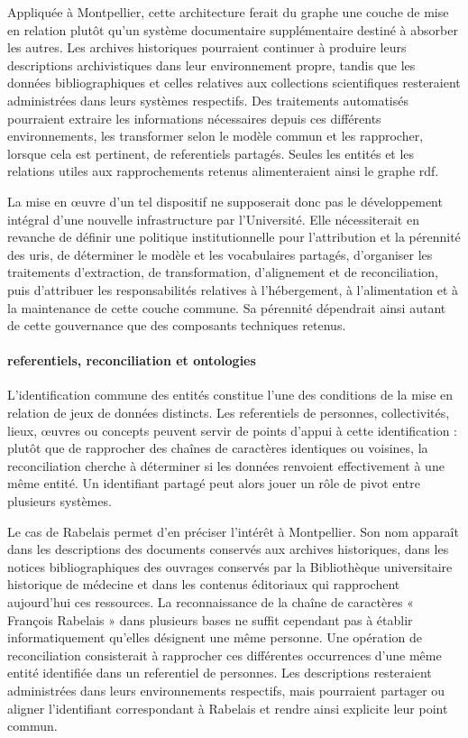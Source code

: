 Appliquée à Montpellier, cette architecture ferait du graphe une couche de mise en relation plutôt qu'un système documentaire supplémentaire destiné à absorber les autres. Les archives historiques pourraient continuer à produire leurs descriptions archivistiques dans leur environnement propre, tandis que les données bibliographiques et celles relatives aux collections scientifiques resteraient administrées dans leurs systèmes respectifs. Des traitements automatisés pourraient extraire les informations nécessaires depuis ces différents environnements, les transformer selon le modèle commun et les rapprocher, lorsque cela est pertinent, de \glspl{referentiel} partagés. Seules les entités et les relations utiles aux rapprochements retenus alimenteraient ainsi le graphe \gls{rdf}.

La mise en œuvre d'un tel dispositif ne supposerait donc pas le développement intégral d'une nouvelle infrastructure par l'Université. Elle nécessiterait en revanche de définir une politique institutionnelle pour l'attribution et la pérennité des \glspl{uri}, de déterminer le modèle et les vocabulaires partagés, d'organiser les traitements d'extraction, de transformation, d'\gls{alignement} et de \gls{reconciliation}, puis d'attribuer les responsabilités relatives à l'hébergement, à l'alimentation et à la maintenance de cette couche commune. Sa pérennité dépendrait ainsi autant de cette gouvernance que des composants techniques retenus.

\paragraph{\Glspl{referentiel}, \gls{reconciliation} et \glspl{ontologie}}

L'identification commune des entités constitue l'une des conditions de la mise en relation de jeux de données distincts. Les \glspl{referentiel} de personnes, collectivités, lieux, œuvres ou concepts peuvent servir de points d'appui à cette identification : plutôt que de rapprocher des chaînes de caractères identiques ou voisines, la \gls{reconciliation} cherche à déterminer si les données renvoient effectivement à une même entité. Un identifiant partagé peut alors jouer un rôle de pivot entre plusieurs systèmes.

Le cas de Rabelais permet d'en préciser l'intérêt à Montpellier. Son nom apparaît dans les descriptions des documents conservés aux archives historiques, dans les notices bibliographiques des ouvrages conservés par la Bibliothèque universitaire historique de médecine et dans les contenus éditoriaux qui rapprochent aujourd'hui ces ressources. La reconnaissance de la chaîne de caractères « François Rabelais » dans plusieurs bases ne suffit cependant pas à établir informatiquement qu'elles désignent une même personne. Une opération de \gls{reconciliation} consisterait à rapprocher ces différentes occurrences d'une même entité identifiée dans un \gls{referentiel} de personnes. Les descriptions resteraient administrées dans leurs environnements respectifs, mais pourraient partager ou aligner l'identifiant correspondant à Rabelais et rendre ainsi explicite leur point commun.

